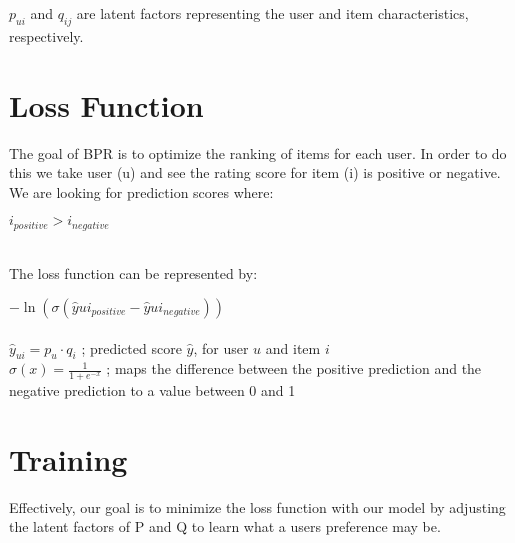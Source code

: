 \documentclass{article}
\begin{document}
\begin{center}
\( p_{ui} \) and \( q_{ij} \) are latent factors representing the user and item characteristics, respectively.

\end{center}

\section{Loss Function}
The goal of BPR is to optimize the ranking of items for each user. In order to do this we take user (u) and see the rating score for item (i) is positive or negative. \\
We are looking for prediction scores where: \\
\begin{center}
    \(i_{positive} > i_{negative}\) \\~\\
\end{center}
The loss function can be represented by:
\begin{center}
    \(-\ln(\sigma(\hat{y}{ui_{positive}} - \hat{y}{ui_{negative}}))\) \\~\\
    \(\hat{y}_{ui} = p_u \cdot q_i \) ; predicted score \(\hat{y}\), for user \(u\) and item \(i\)\\
    \( \sigma(x) = \frac{1}{1 + e^{-x}} \) ; maps the difference between the positive prediction and the negative prediction to a value between 0 and 1
\end{center}

\section{Training}
Effectively, our goal is to minimize the loss function with our model by adjusting the latent factors of P and Q to learn what a users preference may be. 
\end{document}
